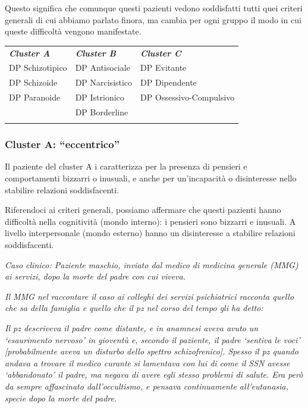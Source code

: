 Questo significa che comunque questi pazienti vedono soddisfatti tutti
quei criteri generali di cui abbiamo parlato finora, ma cambia per ogni
gruppo il modo in cui queste difficoltà vengono manifestate.

\begin{table}
\begin{tabular}{p{}p{}p{}}
\hline\noalign{\smallskip}
\textbf{\emph{Cluster A}} & \textbf{\emph{Cluster B}} & \textbf{\emph{Cluster C}}  \\
\noalign{\smallskip}\svhline\noalign{\smallskip}

DP Schizotipico &	DP Antisociale	& DP Evitante \\
DP Schizoide &	DP Narcisistico & DP Dipendente \\
DP Paranoide &	DP Istrionico &	DP Ossessivo-Compulsivo \\
 & DP Borderline & \\

\noalign{\smallskip}\hline\noalign{\smallskip}
\end{tabular}
\end{table}


\subsubsection{Cluster A: ``eccentrico''}

Il paziente del cluster A i caratterizza per la presenza di pensieri e
comportamenti bizzarri o inusuali, e anche per un'incapacità o
disinteresse nello stabilire relazioni soddisfacenti.

Riferendoci ai criteri generali, possiamo affermare che questi pazienti
hanno difficoltà nella cognitività (mondo interno): i pensieri sono
bizzarri e inusuali. A livello interpersonale (mondo esterno) hanno un
disinteresse a stabilire relazioni soddisfacenti.

\emph{Caso clinico: Paziente maschio, inviato dal medico di medicina
generale (MMG) ai servizi, dopo la morte del padre con cui viveva.}

\emph{Il MMG nel raccontare il caso ai colleghi dei servizi psichiatrici
racconta quello che sa della famiglia e quello che il pz nel corso del
tempo gli ha detto:}

\emph{Il pz descriveva il padre come distante, e in anamnesi aveva avuto
un `esaurimento nervoso' in gioventù e, secondo il paziente, il padre
`sentiva le voci' {[}probabilmente aveva un disturbo dello spettro
schizofrenico{]}. Spesso il pz quando andava a trovare il medico curante
si lamentava con lui di come il SSN avesse `abbandonato' il padre, ma
negava di avere egli stesso problemi di salute. Era però da sempre
affascinato dall'occultismo, e pensava continuamente all'eutanasia,
specie dopo la morte del padre.}

